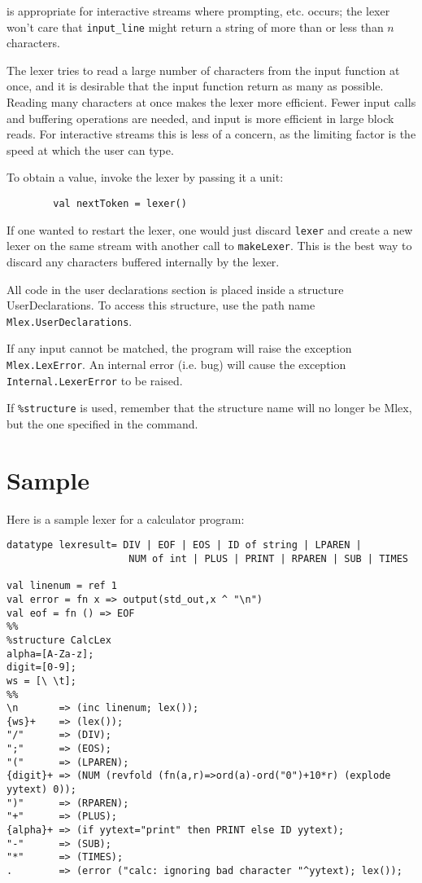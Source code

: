 is appropriate for interactive streams where prompting, etc.  occurs;
the lexer won't care that \verb|input_line| might return a string of more
than or less than $n$ characters.

The lexer tries to read a large number of characters from the input
function at once, and it is desirable that the input function return
as many as possible.  Reading many characters at once makes the lexer
more efficient.  Fewer input calls and buffering operations are
needed, and input is more efficient in large block reads.  For
interactive streams this is less of a concern, as the limiting factor
is the speed at which the user can type.

To obtain a value, invoke the lexer by passing it a unit:

\begin{verbatim}
        val nextToken = lexer()
\end{verbatim}

If one wanted to restart the lexer, one would just discard {\tt lexer}
and create a new lexer on the same stream with another call to
{\tt makeLexer}.  This is the best way to discard any characters buffered
internally by the lexer.

All code in the user declarations section is placed inside a
structure UserDeclarations.  To access this structure, use the path name
{\tt Mlex.UserDeclarations}.

If any input cannot be matched, the program will raise the exception
{\tt Mlex.LexError}.  An internal error (i.e.  bug) will cause the
exception {\tt Internal.LexerError} to be raised.

If {\tt \%structure} is used, remember that the structure name will no
longer be Mlex, but the one specified in the command.

\section{Sample}

Here is a sample lexer for a calculator program:

\small
\begin{verbatim}
datatype lexresult= DIV | EOF | EOS | ID of string | LPAREN |
                     NUM of int | PLUS | PRINT | RPAREN | SUB | TIMES

val linenum = ref 1
val error = fn x => output(std_out,x ^ "\n")
val eof = fn () => EOF
%%
%structure CalcLex
alpha=[A-Za-z];
digit=[0-9];
ws = [\ \t];
%%
\n       => (inc linenum; lex());
{ws}+    => (lex());
"/"      => (DIV);
";"      => (EOS);
"("      => (LPAREN);
{digit}+ => (NUM (revfold (fn(a,r)=>ord(a)-ord("0")+10*r) (explode yytext) 0));
")"      => (RPAREN);
"+"      => (PLUS);
{alpha}+ => (if yytext="print" then PRINT else ID yytext);
"-"      => (SUB);
"*"      => (TIMES);
.        => (error ("calc: ignoring bad character "^yytext); lex());
\end{verbatim}


